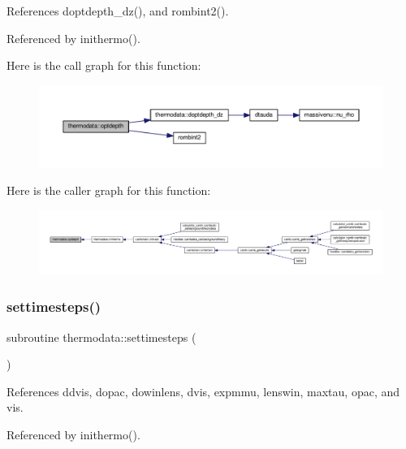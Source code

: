 References doptdepth\+\_\+dz(), and rombint2().



Referenced by inithermo().

Here is the call graph for this function\+:
\nopagebreak
\begin{figure}[H]
\begin{center}
\leavevmode
\includegraphics[width=350pt]{namespacethermodata_a3875da8b58196788145c8f6df6ea6cfe_cgraph}
\end{center}
\end{figure}
Here is the caller graph for this function\+:
\nopagebreak
\begin{figure}[H]
\begin{center}
\leavevmode
\includegraphics[width=350pt]{namespacethermodata_a3875da8b58196788145c8f6df6ea6cfe_icgraph}
\end{center}
\end{figure}
\mbox{\label{namespacethermodata_a53958f3aa160bfde722bffb2b9d47df8}} 
\subsubsection{\texorpdfstring{settimesteps()}{settimesteps()}}
{\footnotesize\ttfamily subroutine thermodata\+::settimesteps (\begin{DoxyParamCaption}{ }\end{DoxyParamCaption})}



References ddvis, dopac, dowinlens, dvis, expmmu, lenswin, maxtau, opac, and vis.



Referenced by inithermo().

